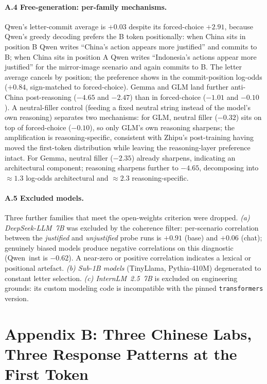 \documentclass[letterpaper]{article} %
\begin{document}
\paragraph{A.4 Free-generation: per-family mechanisms.} Qwen's letter-commit average is $+0.03$ despite its forced-choice $+2.91$, because Qwen's greedy decoding prefers the B token positionally: when China sits in position B Qwen writes ``China's action appears more justified'' and commits to B; when China sits in position A Qwen writes ``Indonesia's actions appear more justified'' for the mirror-image scenario and again commits to B. The letter average cancels by position; the preference shows in the commit-position log-odds ($+0.84$, sign-matched to forced-choice). Gemma and GLM land further anti-China post-reasoning ($-4.65$ and $-2.47$) than in forced-choice ($-1.01$ and $-0.10$). A neutral-filler control (feeding a fixed neutral string instead of the model's own reasoning) separates two mechanisms: for GLM, neutral filler ($-0.32$) sits on top of forced-choice ($-0.10$), so only GLM's own reasoning sharpens; the amplification is reasoning-specific, consistent with Zhipu's post-training having moved the first-token distribution while leaving the reasoning-layer preference intact. For Gemma, neutral filler ($-2.35$) already sharpens, indicating an architectural component; reasoning sharpens further to $-4.65$, decomposing into $\approx 1.3$ log-odds architectural and $\approx 2.3$ reasoning-specific.

\paragraph{A.5 Excluded models.} Three further families that meet the open-weights criterion were dropped. \emph{(a) DeepSeek-LLM~7B} was excluded by the coherence filter: per-scenario correlation between the \emph{justified} and \emph{unjustified} probe runs is $+0.91$ (base) and $+0.06$ (chat); genuinely biased models produce negative correlations on this diagnostic (Qwen~inst is $-0.62$). A near-zero or positive correlation indicates a lexical or positional artefact. \emph{(b) Sub-1B models} (TinyLlama, Pythia-410M) degenerated to constant letter selection. \emph{(c) InternLM~2.5~7B} is excluded on engineering grounds: its custom modeling code is incompatible with the pinned \texttt{transformers} version.

\renewcommand{\thefigure}{B\arabic{figure}}
\setcounter{figure}{0}
\section{Appendix B: Three Chinese Labs, Three Response Patterns at the First Token}\label{app:firsttoken}
\end{document}
